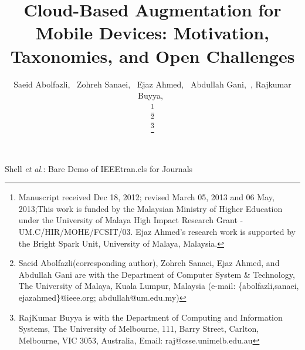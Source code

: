 \documentclass[publish]{IEEEtran}
\begin{document}
\title {Cloud-Based Augmentation for Mobile Devices: Motivation, Taxonomies, and Open Challenges}
\author{Saeid Abolfazli,~ Zohreh Sanaei,~ Ejaz Ahmed,~ Abdullah Gani,~, Rajkumar Buyya,~

\thanks{Manuscript received Dec 18, 2012; revised March 05, 2013 and 06 May, 2013;This work is funded by the Malaysian Ministry of Higher Education under the University of Malaya High Impact Research Grant - UM.C/HIR/MOHE/FCSIT/03. Ejaz Ahmed's research work is supported by the Bright Spark Unit, University of Malaya, Malaysia.} 

\thanks{Saeid Abolfazli(corresponding author), Zohreh Sanaei, Ejaz Ahmed, and Abdullah Gani are with the Department of Computer System \& Technology, The University of Malaya, Kuala Lumpur, Malaysia (e-mail: \{abolfazli,sanaei, ejazahmed\}@ieee.org; abdullah@um.edu.my)}

\thanks{RajKumar Buyya is with the Department of Computing and Information Systems, The University of Melbourne, 111, Barry Street, Carlton, Melbourne, VIC 3053, Australia, Email: raj@csse.unimelb.edu.au}
}
{Shell \MakeLowercase{\textit{et al.}}: Bare Demo of IEEEtran.cls for Journals}
\maketitle
\end{document}
